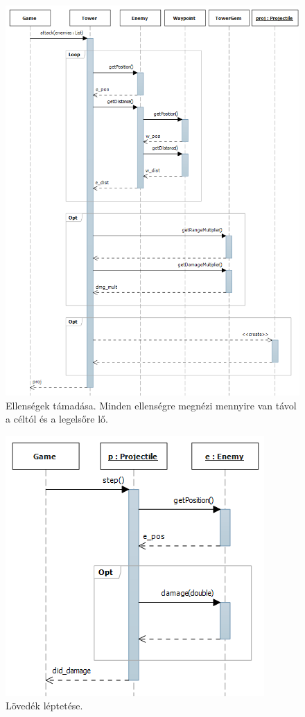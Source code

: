 \begin{figure}[H]
\begin{center}
\includegraphics[width=17cm]{images/ch04/enemy_attack.png}
\caption{Ellenségek támadása. Minden ellenségre megnézi mennyire van távol a céltól és a legelsőre lő.}
\label{fig:tower_firing}
\end{center}
\end{figure}

\begin{figure}[H]
\begin{center}
\includegraphics{images/ch04/projectile_step.png}
\caption{Lövedék léptetése.}
\label{fig:adding_gem}
\end{center}
\end{figure}

